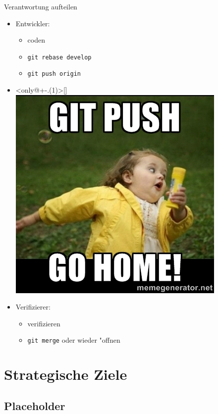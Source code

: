 \documentclass{beamer}
\begin{document}
\begin{frame}{Verantwortung aufteilen}
	\begin{itemize}
		\item<1-> Entwickler:
			\begin{itemize}
				\item coden
				\item \texttt{git rebase develop}
				\item \texttt{git push origin}
			\end{itemize}
		\item<only@+-.(1)>[] \includegraphics[scale=.33]{git-push-go-home.jpg}
		\item<2-> Verifizierer:
			\begin{itemize}
				\item verifizieren
				\item \texttt{git merge} oder wieder "offnen
			\end{itemize}
	\end{itemize}
\end{frame}

\section{Strategische Ziele}
\subsection{Placeholder}
\end{document}
